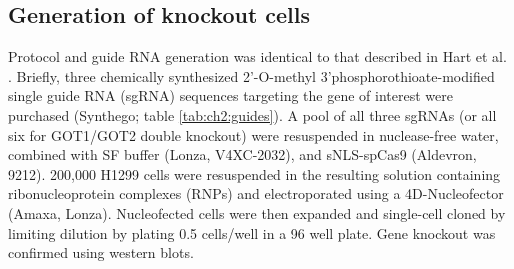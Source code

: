 \subsection{Generation of knockout cells}
Protocol and guide RNA generation was identical to that described in Hart et al. \cite{Hart2023-gp}.
Briefly, three chemically synthesized 2'-O-methyl 3’phosphorothioate-modified single guide RNA (sgRNA) sequences targeting the gene of interest were purchased (Synthego; table \ref{tab:ch2:guides}).
A pool of all three sgRNAs (or all six for GOT1/GOT2 double knockout) were resuspended in nuclease-free water, combined with SF buffer (Lonza, V4XC-2032), and sNLS-spCas9 (Aldevron, 9212).
200,000 H1299 cells were resuspended in the resulting solution containing ribonucleoprotein complexes (RNPs) and electroporated using a 4D-Nucleofector (Amaxa, Lonza).
Nucleofected cells were then expanded and single-cell cloned by limiting dilution by plating 0.5 cells/well in a 96 well plate.
Gene knockout was confirmed using western blots.

